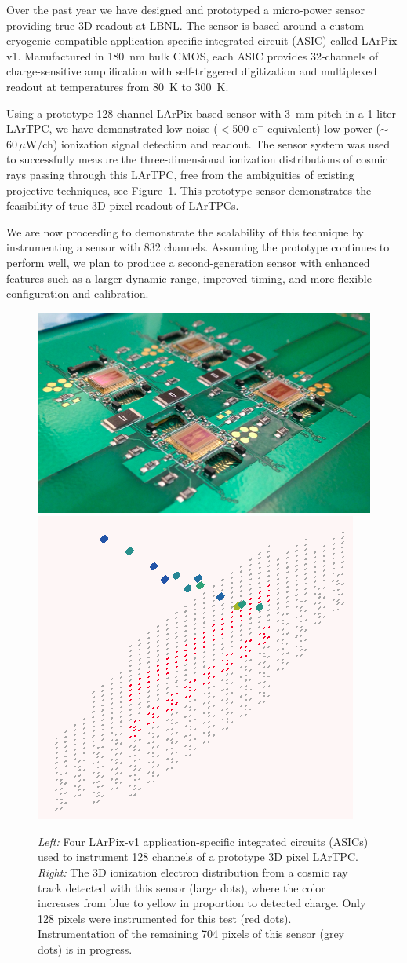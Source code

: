 \documentclass[a4paper]{article}
\begin{document}
Over the past year we have designed and prototyped a micro-power sensor providing true 3D readout at LBNL.
The sensor is based around a custom cryogenic-compatible application-specific integrated circuit (ASIC) called LArPix-v1.
Manufactured in 180~nm bulk CMOS, each ASIC provides 32-channels of charge-sensitive amplification with self-triggered digitization and multiplexed readout at temperatures from 80~K to 300~K.

Using a prototype 128-channel LArPix-based sensor with 3~mm pitch in a 1-liter LArTPC, we have demonstrated low-noise ($<$500 e$^-$ equivalent) low-power ($\sim$60\,$\mu$W/ch) ionization signal detection and readout.
The sensor system was used to successfully measure the three-dimensional ionization distributions of cosmic rays passing through this LArTPC, free from the ambiguities of existing projective techniques, see Figure~\ref{fig:LArPixDemo}.
This prototype sensor demonstrates the feasibility of true 3D pixel readout of LArTPCs.

We are now proceeding to demonstrate the scalability of this technique by instrumenting a sensor with 832 channels.
Assuming the prototype continues to perform well, we plan to produce a second-generation sensor with enhanced features such as a larger dynamic range, improved timing, and more flexible configuration and calibration.


\begin{figure}[htb]
	\centerline{ 
		\includegraphics[width=0.5\columnwidth]{Figures/larpix_4chip_top.png}
		\includegraphics[width=0.35\columnwidth]{Figures/example_track_file3_ev1975.png}
	}
	\caption{ {\em Left:} Four LArPix-v1 application-specific integrated
		circuits (ASICs) used to instrument 128 channels of a prototype 3D
		pixel LArTPC. {\em Right:} The 3D ionization electron distribution
		from a cosmic ray track detected with this sensor (large dots),
		where the color increases from blue to yellow in proportion to
		detected charge.  Only 128 pixels were instrumented for this test
		(red dots).  Instrumentation of the remaining 704 pixels of this
		sensor (grey dots) is in progress.\hfill
		\label{fig:LArPixDemo}}
\end{figure}
	
\end{document}
